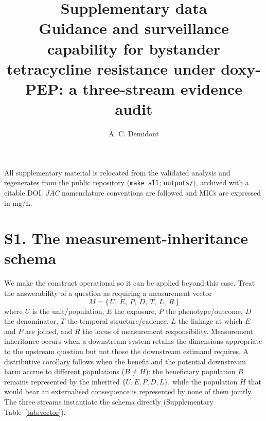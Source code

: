 \documentclass[11pt,a4paper]{article}
\title{\textbf{Supplementary data}\\[6pt]
\large Guidance and surveillance capability for bystander \Sa{} tetracycline
resistance under doxy-PEP: a three-stream evidence audit}
\author{A. C. Demidont}
\date{}
\begin{document}
\maketitle
\thispagestyle{empty}

\noindent All supplementary material is relocated from the validated analysis and
regenerates from the public repository (\texttt{make all}; \texttt{outputs/}),
archived with a citable DOI. \textit{JAC} nomenclature conventions are followed
and MICs are expressed in mg/L.

\section*{S1. The measurement-inheritance schema}

We make the construct operational so it can be applied beyond this case. Treat the
answerability of a question as requiring a measurement vector
\[M=\{\,U,\ E,\ P,\ D,\ T,\ L,\ R\,\}\]
where $U$ is the unit/population, $E$ the exposure, $P$ the phenotype/outcome, $D$
the denominator, $T$ the temporal structure/cadence, $L$ the linkage at which $E$
and $P$ are joined, and $R$ the locus of measurement responsibility. Measurement
inheritance occurs when a downstream system retains the dimensions appropriate to
the upstream question but not those the downstream estimand requires. A
distributive corollary follows when the benefit and the potential downstream harm
accrue to different populations ($B\neq H$): the beneficiary population $B$ remains
represented by the inherited $\{U,E,P,D,L\}$, while the population $H$ that would
bear an externalised consequence is represented by none of them jointly. The three
streams instantiate the schema directly (Supplementary Table~\ref{tab:vector}).
\end{document}
